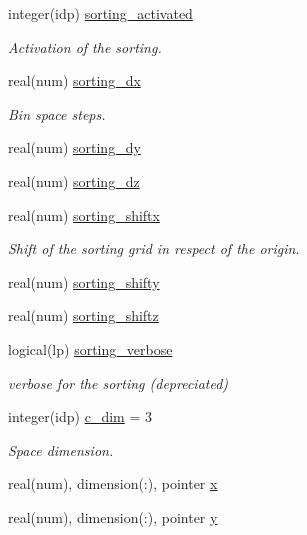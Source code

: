 \begin{DoxyCompactItemize}
integer(idp) \hyperlink{namespaceshared__data_aa7be2be1e809cb95538e562e604c4f1e}{sorting\+\_\+activated}
\begin{DoxyCompactList}\small\item\em Activation of the sorting. \end{DoxyCompactList}\item 
real(num) \hyperlink{namespaceshared__data_a3f406bc80cf450b11767a651d0ea651c}{sorting\+\_\+dx}
\begin{DoxyCompactList}\small\item\em Bin space steps. \end{DoxyCompactList}\item 
real(num) \hyperlink{namespaceshared__data_a4fd74c6832df0957cd1b786cf2cc6810}{sorting\+\_\+dy}
\item 
real(num) \hyperlink{namespaceshared__data_aa30e6dbb24284ab1c4dae4ba5e219eb4}{sorting\+\_\+dz}
\item 
real(num) \hyperlink{namespaceshared__data_a7809127b7e85af886b2fd72b3bbdd065}{sorting\+\_\+shiftx}
\begin{DoxyCompactList}\small\item\em Shift of the sorting grid in respect of the origin. \end{DoxyCompactList}\item 
real(num) \hyperlink{namespaceshared__data_a0f7304391a34d6a0216cab82d97ee037}{sorting\+\_\+shifty}
\item 
real(num) \hyperlink{namespaceshared__data_a6b24bb129ab0581a9b353bd1cb663422}{sorting\+\_\+shiftz}
\item 
logical(lp) \hyperlink{namespaceshared__data_a3967a61950e8f0c86d9ecd322e3d05ec}{sorting\+\_\+verbose}
\begin{DoxyCompactList}\small\item\em verbose for the sorting (depreciated) \end{DoxyCompactList}\item 
integer(idp) \hyperlink{namespaceshared__data_a9dcd30bdab987f8957482cbd80ba40b3}{c\+\_\+dim} = 3
\begin{DoxyCompactList}\small\item\em Space dimension. \end{DoxyCompactList}\item 
real(num), dimension(\+:), pointer \hyperlink{namespaceshared__data_a5a1b9ce71c6bcfbe478783cc7a5e4d7d}{x}
\item 
real(num), dimension(\+:), pointer \hyperlink{namespaceshared__data_acdc008c8a2a09f5f45b09e3f93aa04cf}{y}

\end{DoxyCompactItemize}

